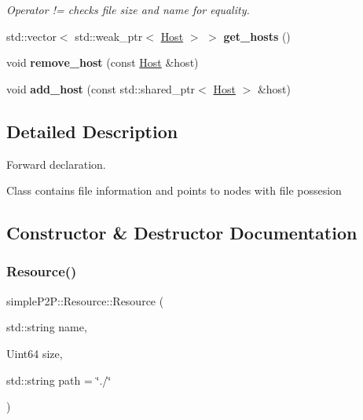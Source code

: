 \begin{DoxyCompactItemize}
\begin{DoxyCompactList}\small\item\em Operator != checks file size and name for equality. \end{DoxyCompactList}\item 
\mbox{\label{classsimpleP2P_1_1Resource_ad27e59cd404e37f7d36434cb5fa7a94c}} 
std\+::vector$<$ std\+::weak\+\_\+ptr$<$ \hyperlink{classsimpleP2P_1_1Host}{Host} $>$ $>$ {\bfseries get\+\_\+hosts} ()
\item 
\mbox{\label{classsimpleP2P_1_1Resource_a7775428c9cf724eec46326d9fd488629}} 
void {\bfseries remove\+\_\+host} (const \hyperlink{classsimpleP2P_1_1Host}{Host} \&host)
\item 
\mbox{\label{classsimpleP2P_1_1Resource_a44f7ffb0ac8d288fdfff4e760b30dbc1}} 
void {\bfseries add\+\_\+host} (const std\+::shared\+\_\+ptr$<$ \hyperlink{classsimpleP2P_1_1Host}{Host} $>$ \&host)
\end{DoxyCompactItemize}


\subsection{Detailed Description}
Forward declaration. 

Class contains file information and points to nodes with file possesion 

\subsection{Constructor \& Destructor Documentation}
\mbox{\label{classsimpleP2P_1_1Resource_a0aed54e6cf7d3a5fa2c53fe3b3b57d19}} 
\subsubsection{\texorpdfstring{Resource()}{Resource()}\hspace{0.1cm}{\footnotesize\ttfamily [1/2]}}
{\footnotesize\ttfamily simple\+P2\+P\+::\+Resource\+::\+Resource (\begin{DoxyParamCaption}\item[{std\+::string}]{name,  }\item[{Uint64}]{size,  }\item[{std\+::string}]{path = {\ttfamily \char`\"{}./\char`\"{}} }\end{DoxyParamCaption})}




